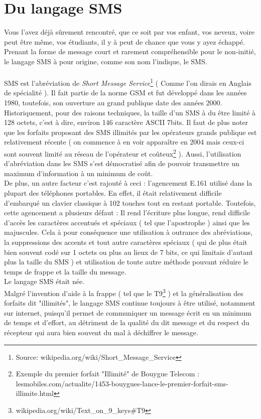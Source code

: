 \documentclass[11pt]{report}
\begin{document}
	\section{Du langage SMS}
	Vous l'avez déjà sûrement rencontré, que ce soit par vos enfant, vos neveux, voire peut être même, vos étudiants, il y à peut de chance que vous y ayez échappé. Prenant la forme de message court et rarement compréhensible pour le non-initié, le langage SMS à pour origine, comme son nom l'indique, le SMS.
	\paragraph{}
	SMS est l'abréviation de {\em Short Message Service}\footnote{Source: wikipedia.org/wiki/Short\_Message\_Service} ( Comme l'on dirais en Anglais de spécialité ). Il fait partie de la norme GSM et fut développé dans les années 1980, toutefois, son ouverture au grand publique date des années 2000. Historiquement, pour des raisons techniques, la taille d'un SMS à du être limité à 128 octets, c'est à dire, environ 146 caractère ASCII 7bits. Il faut de plus noter que les forfaits proposant des SMS illimités par les opérateurs grands publique est relativement récente ( on commence à en voir apparaître en 2004 mais ceux-ci sont souvent limité au réseau de l'opérateur et coûteux\footnote{Exemple du premier forfait "Illimité" de Bouygue Telecom : lesmobiles.com/actualite/1453-bouygues-lance-le-premier-forfait-sms-illimite.html} ). Aussi, l'utilisation d'abréviation dans les SMS s'est démocratisé afin de pouvoir transmettre un maximum d'information à un minimum de coût.\\
	De plus, un autre facteur c'est rajouté à ceci : l'agencement E.161 utilisé dans la plupart des téléphones portables. En effet, il était relativement difficile d'embarqué un clavier classique à 102 touches tout en restant portable. Toutefois, cette agencement a plusieurs défaut : Il rend l'écriture plus longue, rend difficile d'accès les caractères accentués et spéciaux ( tel que l'apostrophe ) ainsi que les majuscules. Cela à pour conséquence une utilisation à outrance des abréviations, la suppressions des accents et tout autre caractères spéciaux ( qui de plus était bien souvent codé sur 1 octets ou plus au lieux de 7 bits, ce qui limitais d'autant plus la taille du SMS ) et utilisation de toute autre méthode pouvant réduire le temps de frappe et la taille du message.\\
	Le langage SMS était née.\\
	Malgré l'invention d'aide à la frappe ( tel que le T9\footnote{wikipedia.org/wiki/Text\_on\_9\_keys\#T9} ) et la généralisation des forfaits dit "illimités", le langage SMS continue toujours à être utilisé, notamment sur internet, puisqu'il permet de communiquer un message écrit en un minimum de temps et d'effort, au détriment de la qualité du dit message et du respect du récepteur qui aura bien souvent du mal à déchiffrer le message.\\
\end{document}
